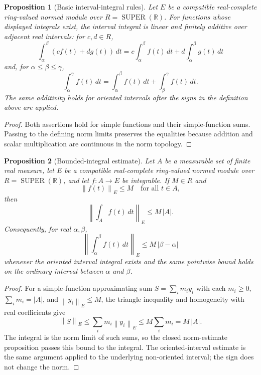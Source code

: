 \documentclass{amsart}
\newtheorem{prop}{Proposition}
\DeclareMathOperator{\SUPER}{SUPER}
\newcommand{\norm}[1]{\left\lVert #1\right\rVert}
\newcommand{\abs}[1]{\left\lvert #1\right\rvert}
\begin{document}
\begin{prop}[Basic interval-integral rules]
Let $E$ be a compatible real-complete ring-valued normed module over
$R=\SUPER(\mathbb{R})$.  For functions whose displayed integrals exist, the
interval integral is linear and finitely additive over adjacent real
intervals: for $c,d\in R$,
\[
  \int_\alpha^\beta (cf(t)+dg(t))\,dt
  =
  c\int_\alpha^\beta f(t)\,dt+d\int_\alpha^\beta g(t)\,dt
\]
and, for $\alpha\leq\beta\leq\gamma$,
\[
  \int_\alpha^\gamma f(t)\,dt
  =
  \int_\alpha^\beta f(t)\,dt+\int_\beta^\gamma f(t)\,dt .
\]
The same additivity holds for oriented intervals after the signs in the
definition above are applied.
\end{prop}

\begin{proof}
Both assertions hold for simple functions and their simple-function sums.
Passing to the defining norm limits preserves the equalities because addition
and scalar multiplication are continuous in the norm topology.
\end{proof}

\begin{prop}[Bounded-integral estimate]
Let $A$ be a measurable set of finite real measure, let $E$ be a compatible
real-complete ring-valued normed module over $R=\SUPER(\mathbb{R})$, and let
$f:A\to E$ be integrable.  If $M\in R$ and
\[
  \norm{f(t)}_E\leq M
  \quad\text{for all }t\in A,
\]
then
\[
  \norm{\int_A f(t)\,dt}_E\leq M\,|A|.
\]
Consequently, for real $\alpha,\beta$,
\[
  \norm{\int_\alpha^\beta f(t)\,dt}_E
  \leq M\,\abs{\beta-\alpha}
\]
whenever the oriented interval integral exists and the same pointwise bound
holds on the ordinary interval between $\alpha$ and $\beta$.
\end{prop}

\begin{proof}
For a simple-function approximating sum
$S=\sum_i m_i y_i$ with each $m_i\geq0$, $\sum_i m_i=|A|$, and
$\norm{y_i}_E\leq M$, the triangle inequality and homogeneity with real
coefficients give
\[
  \norm{S}_E\leq\sum_i m_i\norm{y_i}_E\leq M\sum_i m_i=M\,|A|.
\]
The integral is the norm limit of such sums, so the closed norm-estimate
proposition passes this bound to the integral.  The oriented-interval estimate
is the same argument applied to the underlying non-oriented interval; the sign
does not change the norm.
\end{proof}
\end{document}
